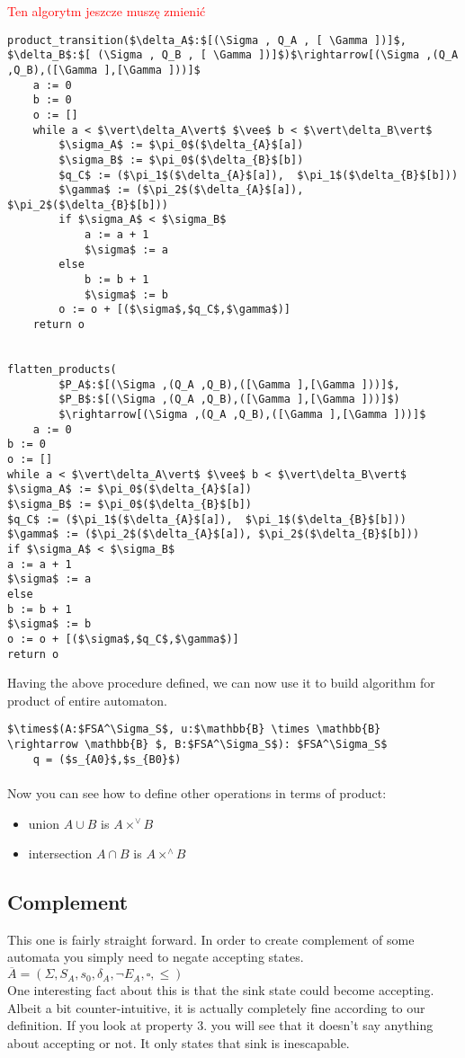\documentclass[12pt]{article}
\begin{document}
\textcolor{red}{Ten algorytm jeszcze muszę zmienić} 
\begin{lstlisting}
product_transition($\delta_A$:$[(\Sigma , Q_A , [ \Gamma ])]$, $\delta_B$:$[ (\Sigma , Q_B , [ \Gamma ])]$)$\rightarrow[(\Sigma ,(Q_A ,Q_B),([\Gamma ],[\Gamma ]))]$
    a := 0
    b := 0
    o := []
    while a < $\vert\delta_A\vert$ $\vee$ b < $\vert\delta_B\vert$
        $\sigma_A$ := $\pi_0$($\delta_{A}$[a])
        $\sigma_B$ := $\pi_0$($\delta_{B}$[b])
        $q_C$ := ($\pi_1$($\delta_{A}$[a]),  $\pi_1$($\delta_{B}$[b]))
        $\gamma$ := ($\pi_2$($\delta_{A}$[a]), $\pi_2$($\delta_{B}$[b]))
        if $\sigma_A$ < $\sigma_B$
            a := a + 1
            $\sigma$ := a
        else
            b := b + 1
            $\sigma$ := b
        o := o + [($\sigma$,$q_C$,$\gamma$)] 
    return o
    
    
flatten_products(
        $P_A$:$[(\Sigma ,(Q_A ,Q_B),([\Gamma ],[\Gamma ]))]$,
        $P_B$:$[(\Sigma ,(Q_A ,Q_B),([\Gamma ],[\Gamma ]))]$)
        $\rightarrow[(\Sigma ,(Q_A ,Q_B),([\Gamma ],[\Gamma ]))]$
    a := 0
b := 0
o := []
while a < $\vert\delta_A\vert$ $\vee$ b < $\vert\delta_B\vert$
$\sigma_A$ := $\pi_0$($\delta_{A}$[a])
$\sigma_B$ := $\pi_0$($\delta_{B}$[b])
$q_C$ := ($\pi_1$($\delta_{A}$[a]),  $\pi_1$($\delta_{B}$[b]))
$\gamma$ := ($\pi_2$($\delta_{A}$[a]), $\pi_2$($\delta_{B}$[b]))
if $\sigma_A$ < $\sigma_B$
a := a + 1
$\sigma$ := a
else
b := b + 1
$\sigma$ := b
o := o + [($\sigma$,$q_C$,$\gamma$)] 
return o
\end{lstlisting}
Having the above procedure defined, we can now use it to build algorithm for product of entire automaton.
\begin{lstlisting}
$\times$(A:$FSA^\Sigma_S$, u:$\mathbb{B} \times \mathbb{B}  \rightarrow \mathbb{B} $, B:$FSA^\Sigma_S$): $FSA^\Sigma_S$
    q = ($s_{A0}$,$s_{B0}$)
\end{lstlisting}
\paragraph{}
Now you can see how to define other operations in terms of product:
\begin{itemize}
	\item union $A \cup B$ is $A\times^\vee B$
	\item intersection $A \cap B$ is $A\times^\wedge B$ 
\end{itemize}

\subsection{ Complement}
This one is fairly straight forward. In order to create complement of some automata you simply need to negate accepting states. \\
$\overline{A} = (\Sigma , S_A , s_{0}, \delta_{A}, \neg E_A, \square , \le) $ \\
One interesting fact about this is that the sink state could become accepting. Albeit a bit counter-intuitive, it is actually completely fine according to our definition. If you look at property 3. you will see that it doesn't say anything about accepting or not. It only states that sink is inescapable. 
\end{document}
